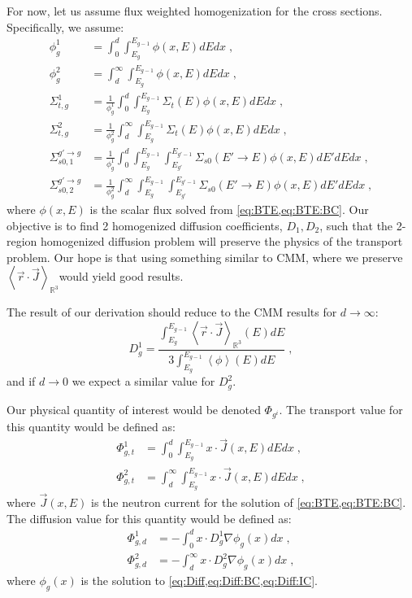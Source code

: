 \documentclass[a4paper,letterpaper,12pt,oneside,draft]{article}
\newcommand{\eec}{\;,}
\newcommand{\allspace}{\ensuremath{\mathbb{R}^3}}
\newcommand{\bracket}[1]{\ensuremath{\left\langle #1 \right\rangle}}
\newcommand{\bracketex}[2][V]{\ensuremath{\bracket{#2}_{#1}}}
\newcommand{\rdotJ}[1][\allspace]{\bracketex[#1]{\vec{r}\cdot\vec{J}}}
\newcommand{\intg}[2][g]{\ensuremath{\int_{E_{#1}}^{E_{#1-1}} #2 dE}}
\begin{document}
    For now, let us assume flux weighted homogenization for the cross sections. Specifically, we assume:
    \begin{align}
        \phi_{g}^1 &= \int_{0}^{d}\intg{\phi(x,E)}dx \eec\\
        \phi_{g}^2 &= \int_{d}^{\infty}\intg{\phi(x,E)}dx \eec\\
        \Sigma_{t,g}^1 &= \frac{1}{\phi_g^1}\int_{0}^{d}\intg{\Sigma_t(E)\phi(x,E)}dx \eec\\
        \Sigma_{t,g}^2 &= \frac{1}{\phi_g^2}\int_{d}^{\infty}\intg{\Sigma_t(E)\phi(x,E)}dx \eec\\
        \Sigma_{s0,1}^{g'\to g} &= \frac{1}{\phi_g^1} \int_{0}^{d}\intg{\intg[g']{\Sigma_{s0}(E'\to E)\phi(x,E)}'}dx \eec\\
        \Sigma_{s0,2}^{g'\to g} &= \frac{1}{\phi_g^2} \int_{d}^{\infty}\intg{\intg[g']{\Sigma_{s0}(E'\to E)\phi(x,E)}'}dx \eec
    \end{align}
    where $\phi(x,E)$ is the scalar flux solved from \cref{eq:BTE,eq:BTE:BC}.
    Our objective is to find 2 homogenized diffusion coefficients, $D_1,D_2$, such that the 2-region homogenized diffusion problem will preserve the physics of the transport problem.
    Our hope is that using something similar to CMM, where we preserve \rdotJ would yield good results. 
    
    The result of our derivation should reduce to the CMM results for $d\to\infty$:
    \begin{equation*}
        D^1_g = \frac{\intg{\rdotJ(E)}}{3\intg{\bracket{\phi}(E)}} \eec
    \end{equation*}
    and if $d\to0$ we expect a similar value for $D_g^2$.
    
    Our physical quantity of interest would be denoted $\Phi_{g^i}$. The transport value for this quantity would be defined as:
    \begin{align}
        \label{eq:Phi1:Transport}
        \Phi_{g,t}^1 &= \int_{0}^{d}\intg{x\cdot \vec{J}(x,E)}dx \eec \\\nonumber
        \Phi_{g,t}^2 &= \int_{d}^{\infty}\intg{x\cdot \vec{J}(x,E)}dx \eec
    \end{align}
    where $\vec{J}(x,E)$ is the neutron current for the solution of \cref{eq:BTE,eq:BTE:BC}.
    The diffusion value for this quantity would be defined as:
    \begin{align}
        \label{eq:Phi1:Diffusion}
        \Phi_{g,d}^1 &= -\int_{0}^{d}x\cdot D_g^1\nabla\phi_g(x)dx \eec \\\nonumber
        \Phi_{g,d}^2 &= -\int_{d}^{\infty}x\cdot D_g^2\nabla\phi_g(x)dx \eec
    \end{align}
    where $\phi_g(x)$ is the solution to \cref{eq:Diff,eq:Diff:BC,eq:Diff:IC}.
    
\end{document}
